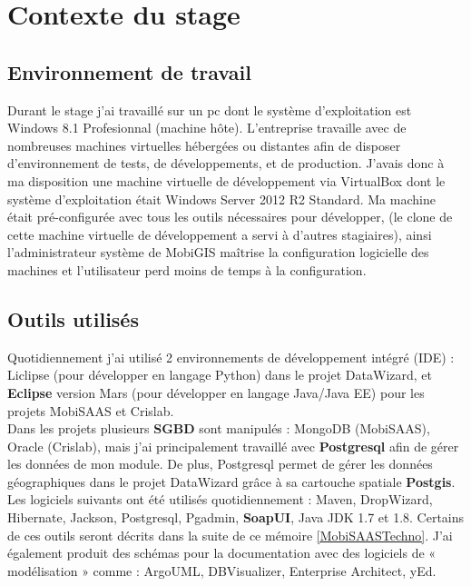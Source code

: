 \chapter{Contexte du stage}
\label{AnalyseConception}

\section{Environnement de travail}

Durant le stage j'ai travaillé sur un pc dont le système d'exploitation est Windows 8.1 Profesionnal (machine hôte). L'entreprise travaille avec de nombreuses machines virtuelles hébergées ou distantes afin de disposer d'environnement de tests, de développements, et de production. J'avais donc à ma disposition une machine virtuelle de développement via VirtualBox dont le système d'exploitation était Windows Server 2012 R2 Standard. 
Ma machine était pré-configurée avec tous les outils nécessaires pour développer, (le clone de cette machine virtuelle de développement a servi à d'autres stagiaires), ainsi l'administrateur système de MobiGIS maîtrise la configuration logicielle des machines et l'utilisateur perd moins de temps à la configuration.\\

\section{Outils utilisés}

Quotidiennement j'ai utilisé 2 environnements de développement intégré (IDE) : Liclipse (pour développer en langage Python) dans le projet DataWizard, et \textbf{Eclipse} version Mars (pour développer en langage Java/Java EE) pour les projets MobiSAAS et Crislab.\\

Dans les projets plusieurs \textbf{SGBD} sont manipulés : MongoDB (MobiSAAS), Oracle (Crislab), mais j'ai principalement travaillé avec \textbf{Postgresql} afin de gérer les données de mon module. De plus, Postgresql permet de gérer les données géographiques dans le projet \og DataWizard \fg grâce à sa cartouche spatiale \textbf{Postgis}.\\

Les logiciels suivants ont été utilisés quotidiennement : Maven, DropWizard, Hibernate, Jackson, Postgresql, Pgadmin, \textbf{SoapUI}, Java JDK 1.7 et 1.8. Certains de ces outils seront décrits dans la suite de ce mémoire \ref{MobiSAASTechno}.
J'ai également produit des schémas pour la documentation avec des logiciels de « modélisation » comme : ArgoUML, DBVisualizer, Enterprise Architect, yEd.\\

